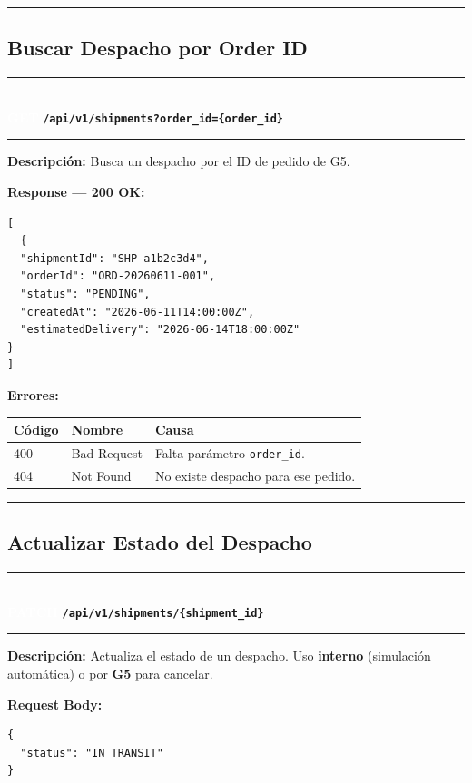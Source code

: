 \documentclass[11pt, a4paper]{article}
\newcommand{\httpmethod}[2]{%
  \colorbox{#1}{\textcolor{white}{\textbf{\small\textsf{#2}}}}%
}
\newcommand{\routeheader}[3]{%
  \noindent\rule{\textwidth}{1.5pt}\\[0.3em]
  \httpmethod{#1}{#2}\;\texttt{\bfseries #3}\\[0.3em]
  \rule{\textwidth}{0.4pt}
  \vspace{0.3cm}
}
\begin{document}
\noindent\rule{\textwidth}{0.4pt}

\subsection{Buscar Despacho por Order ID}

\routeheader{get}{GET}{/api/v1/shipments?order\_id=\{order\_id\}}

\textbf{Descripción:} Busca un despacho por el ID de pedido de G5.

\vspace{0.3cm}
\textbf{Response --- 200 OK:}

\begin{lstlisting}
[
  {
  "shipmentId": "SHP-a1b2c3d4",
  "orderId": "ORD-20260611-001",
  "status": "PENDING",
  "createdAt": "2026-06-11T14:00:00Z",
  "estimatedDelivery": "2026-06-14T18:00:00Z"
}
]
\end{lstlisting}

\textbf{Errores:}
\begin{table}[ht!]
\small
\begin{tabularx}{\textwidth}{l l X}
  \toprule
  \textbf{Código} & \textbf{Nombre} & \textbf{Causa} \\
  \midrule
  400 & Bad Request & Falta parámetro \texttt{order\_id}. \\
  404 & Not Found   & No existe despacho para ese pedido. \\
  \bottomrule
\end{tabularx}
\end{table}

\noindent\rule{\textwidth}{0.4pt}

\subsection{Actualizar Estado del Despacho}

\routeheader{patch}{PATCH}{/api/v1/shipments/\{shipment\_id\}}

\textbf{Descripción:} Actualiza el estado de un despacho. Uso \textbf{interno}
(simulación automática) o por \textbf{G5} para cancelar.

\vspace{0.3cm}
\textbf{Request Body:}

\begin{lstlisting}
{
  "status": "IN_TRANSIT"
}
\end{lstlisting}
\end{document}
